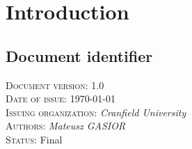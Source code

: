 \chapter{Introduction} \label{chp:introduction}

\section{Document identifier} \label{s:introduction:document-identifier}
	\begin{comment}
		$<$Uniquely identify a version of the document by including information such as the date of issue, the issuing organization, the author(s), the approval signatures (possibly electronic), and the status/version (e.g., draft, reviewed, corrected, or final). Identifying information may also include the reviewers and pertinent managers. This information is commonly put on an early page in the document, such as the cover page or the pages immediately following it. Some organizations put this information at the end of the document. This information may also be kept in a place other than in the text of the document (e.g., in the configuration management system or in the header or footer of the document).$>$
	\end{comment}
	\textsc{Document version: } 1.0 \\
	\textsc{Date of issue:} \today \\
	\textsc{Issuing organization:} \textit{Cranfield University} \\
	\textsc{Authors: } \textit{Mateusz GASIOR} \\
	\textsc{Status: } Final \\

